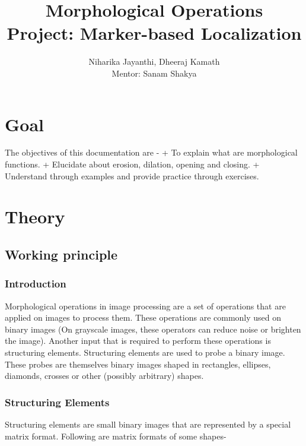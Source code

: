 \documentclass[]{article}
\date{}
\begin{document}
	\title{\huge\textbf{Morphological Operations}\LARGE \\Project: Marker-based Localization}
	\author{Niharika Jayanthi, Dheeraj Kamath \\Mentor: Sanam Shakya}
	\maketitle
	\pagebreak
\section{Goal}\label{goal}

The objectives of this documentation are - + To explain what are
morphological functions. + Elucidate about erosion, dilation, opening
and closing. + Understand through examples and provide practice through
exercises.

\section{Theory}\label{theory}

\subsection{Working principle}\label{working-principle}

\subsubsection{Introduction}\label{introduction}

Morphological operations in image processing are a set of operations
that are applied on images to process them. These operations are
commonly used on binary images (On grayscale images, these operators can
reduce noise or brighten the image). Another input that is required to
perform these operations is structuring elements. Structuring elements
are used to probe a binary image. These probes are themselves binary
images shaped in rectangles, ellipses, diamonds, crosses or other
(possibly arbitrary) shapes.

\subsubsection{Structuring Elements}\label{structuring-elements}

Structuring elements are small binary images that are represented by a
special matrix format. Following are matrix formats of some shapes-
\end{document}
